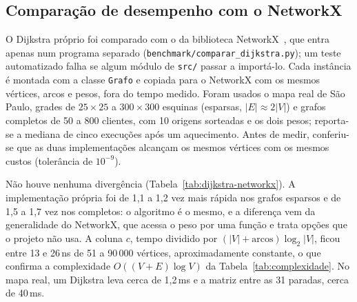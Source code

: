 \documentclass[12pt]{article}
\begin{document}
\subsection{Comparação de desempenho com o NetworkX}\label{sec:networkx}

O Dijkstra próprio foi comparado com o da biblioteca NetworkX~\cite{hagberg2008networkx},
que entra apenas num programa separado (\texttt{benchmark/comparar\_dijkstra.py}); um
teste automatizado falha se algum módulo de \texttt{src/} passar a importá-lo. Cada
instância é montada com a classe \texttt{Grafo} e copiada para o NetworkX com os mesmos
vértices, arcos e pesos, fora do tempo medido. Foram usados o mapa real de São Paulo,
grades de $25\times25$ a $300\times300$ esquinas (esparsas, $|E| \approx 2|V|$) e grafos
completos de 50 a 800 clientes, com 10 origens sorteadas e os dois pesos; reporta-se a
mediana de cinco execuções após um aquecimento. Antes de medir, conferiu-se que as duas
implementações alcançam os mesmos vértices com os mesmos custos (tolerância de
$10^{-9}$).

Não houve nenhuma divergência (Tabela~\ref{tab:dijkstra-networkx}). A implementação
própria foi de 1,1 a 1,2 vez mais rápida nos grafos esparsos e de 1,5 a 1,7 vez nos
completos: o algoritmo é o mesmo, e a diferença vem da generalidade do NetworkX, que
acessa o peso por uma função e trata opções que o projeto não usa. A coluna $c$, tempo
dividido por $(|V| + \text{arcos}) \log_2 |V|$, ficou entre 13 e 26\,ns de 51 a 90\,000
vértices, aproximadamente constante, o que confirma a complexidade $O((V+E)\log V)$ da
Tabela~\ref{tab:complexidade}. No mapa real, um Dijkstra leva cerca de 1,2\,ms e a
matriz entre as 31 paradas, cerca de 40\,ms.
\end{document}
